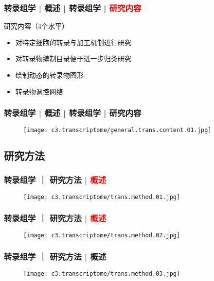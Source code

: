 \begin{frame}
  \frametitle{转录组学 | 概述 | 转录组学 | \textcolor{red}{研究内容}}
  \begin{block}{研究内容（4个水平）}
    \begin{itemize}
      \item 对特定细胞的转录与加工机制进行研究
      \item 对转录物编制目录便于进一步归类研究
      \item 绘制动态的转录物图形
      \item 转录物调控网络
    \end{itemize}
  \end{block}
\end{frame}

\begin{frame}
  \frametitle{转录组学 | 概述 | 转录组学 | 研究内容}
  \begin{figure}
    \centering
    \texttt{[image: c3.transcriptome/general.trans.content.01.jpg]}
  \end{figure}
\end{frame}

\subsection{研究方法}
\begin{frame}
  \frametitle{转录组学 ｜ 研究方法 | \textcolor{red}{概述}}
  \begin{figure}
    \centering
    \texttt{[image: c3.transcriptome/trans.method.01.jpg]}
  \end{figure}
\end{frame}

\begin{frame}
  \frametitle{转录组学 ｜ 研究方法 | \textcolor{red}{概述}}
  \begin{figure}
    \centering
    \texttt{[image: c3.transcriptome/trans.method.02.jpg]}
  \end{figure}
\end{frame}

\begin{frame}
  \frametitle{转录组学 ｜ 研究方法 | 概述}
  \begin{figure}
    \centering
    \texttt{[image: c3.transcriptome/trans.method.03.jpg]}
  \end{figure}
\end{frame}

